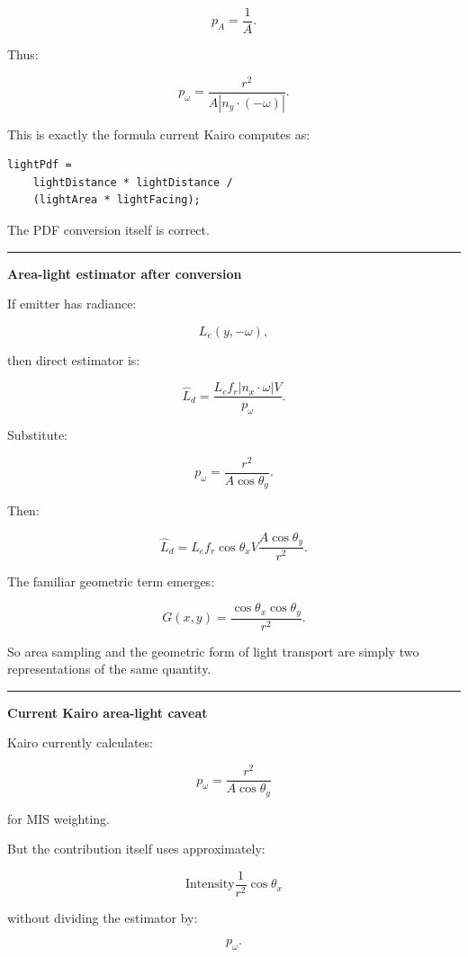 \[
p_A=\frac1A.
\]

Thus:

\[
\boxed{
p_\omega
=
\frac{
r^2
}{
A|n_y\cdot(-\omega)|
}.
}
\]

This is exactly the formula current Kairo computes as:

\begin{verbatim}
lightPdf =
    lightDistance * lightDistance /
    (lightArea * lightFacing);
\end{verbatim}

The PDF conversion itself is correct.

\begin{center}\rule{0.5\linewidth}{0.5pt}\end{center}

\textbf{Area-light estimator after conversion}

If emitter has radiance:

\[
L_e(y,-\omega),
\]

then direct estimator is:

\[
\boxed{
\hat L_d
=
\frac{
L_e
f_r
|n_x\cdot\omega|
V
}{
p_\omega
}.
}
\]

Substitute:

\[
p_\omega
=
\frac{r^2}{A\cos\theta_y}.
\]

Then:

\[
\hat L_d
=
L_e
f_r
\cos\theta_x
V
\frac{
A\cos\theta_y
}{
r^2
}.
\]

The familiar geometric term emerges:

\[
\boxed{
G(x,y)
=
\frac{
\cos\theta_x\cos\theta_y
}{
r^2
}.
}
\]

So area sampling and the geometric form of light transport are simply two representations of the same quantity.

\begin{center}\rule{0.5\linewidth}{0.5pt}\end{center}

\textbf{Current Kairo area-light caveat}

Kairo currently calculates:

\[
p_\omega
=
\frac{r^2}{A\cos\theta_y}
\]

for MIS weighting.

But the contribution itself uses approximately:

\[
\text{Intensity}
\frac1{r^2}
\cos\theta_x
\]

without dividing the estimator by:

\[
p_\omega.
\]

